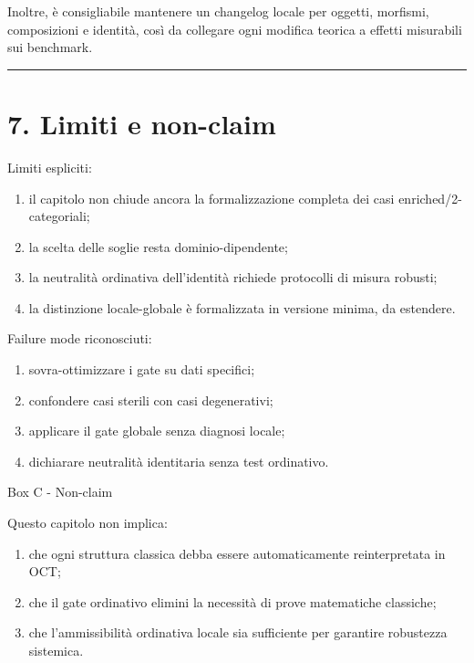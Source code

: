 Inoltre, è consigliabile mantenere un changelog locale per oggetti, morfismi, composizioni e identità, così da collegare ogni modifica teorica a effetti misurabili sui benchmark.

\begin{center}\rule{0.5\linewidth}{0.5pt}\end{center}

\section{7. Limiti e non-claim}

Limiti espliciti:

\begin{enumerate}
\def\labelenumi{\arabic{enumi}.}
\tightlist
\item
  il capitolo non chiude ancora la formalizzazione completa dei casi enriched/2-categoriali;
\item
  la scelta delle soglie resta dominio-dipendente;
\item
  la neutralità ordinativa dell'identità richiede protocolli di misura robusti;
\item
  la distinzione locale-globale è formalizzata in versione minima, da estendere.
\end{enumerate}

Failure mode riconosciuti:

\begin{enumerate}
\def\labelenumi{\arabic{enumi}.}
\tightlist
\item
  sovra-ottimizzare i gate su dati specifici;
\item
  confondere casi sterili con casi degenerativi;
\item
  applicare il gate globale senza diagnosi locale;
\item
  dichiarare neutralità identitaria senza test ordinativo.
\end{enumerate}

Box C - Non-claim

Questo capitolo non implica:

\begin{enumerate}
\def\labelenumi{\arabic{enumi}.}
\tightlist
\item
  che ogni struttura classica debba essere automaticamente reinterpretata in OCT;
\item
  che il gate ordinativo elimini la necessità di prove matematiche classiche;
\item
  che l'ammissibilità ordinativa locale sia sufficiente per garantire robustezza sistemica.
\end{enumerate}

